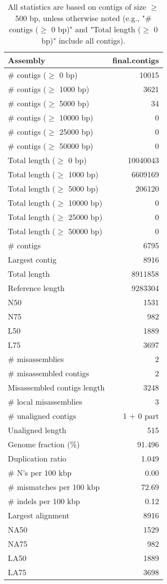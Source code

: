 \documentclass[12pt,a4paper]{article}
\begin{document}
\begin{table}[ht]
\begin{center}
\caption{All statistics are based on contigs of size $\geq$ 500 bp, unless otherwise noted (e.g., "\# contigs ($\geq$ 0 bp)" and "Total length ($\geq$ 0 bp)" include all contigs).}
\begin{tabular}{|l*{1}{|r}|}
\hline
Assembly & final.contigs \\ \hline
\# contigs ($\geq$ 0 bp) & 10015 \\ \hline
\# contigs ($\geq$ 1000 bp) & 3621 \\ \hline
\# contigs ($\geq$ 5000 bp) & 34 \\ \hline
\# contigs ($\geq$ 10000 bp) & 0 \\ \hline
\# contigs ($\geq$ 25000 bp) & 0 \\ \hline
\# contigs ($\geq$ 50000 bp) & 0 \\ \hline
Total length ($\geq$ 0 bp) & 10040043 \\ \hline
Total length ($\geq$ 1000 bp) & 6609169 \\ \hline
Total length ($\geq$ 5000 bp) & 206120 \\ \hline
Total length ($\geq$ 10000 bp) & 0 \\ \hline
Total length ($\geq$ 25000 bp) & 0 \\ \hline
Total length ($\geq$ 50000 bp) & 0 \\ \hline
\# contigs & 6795 \\ \hline
Largest contig & 8916 \\ \hline
Total length & 8911858 \\ \hline
Reference length & 9283304 \\ \hline
N50 & 1531 \\ \hline
N75 & 982 \\ \hline
L50 & 1889 \\ \hline
L75 & 3697 \\ \hline
\# misassemblies & 2 \\ \hline
\# misassembled contigs & 2 \\ \hline
Misassembled contigs length & 3248 \\ \hline
\# local misassemblies & 3 \\ \hline
\# unaligned contigs & 1 + 0 part \\ \hline
Unaligned length & 515 \\ \hline
Genome fraction (\%) & 91.496 \\ \hline
Duplication ratio & 1.049 \\ \hline
\# N's per 100 kbp & 0.00 \\ \hline
\# mismatches per 100 kbp & 72.69 \\ \hline
\# indels per 100 kbp & 0.12 \\ \hline
Largest alignment & 8916 \\ \hline
NA50 & 1529 \\ \hline
NA75 & 982 \\ \hline
LA50 & 1889 \\ \hline
LA75 & 3698 \\ \hline
\end{tabular}
\end{center}
\end{table}
\end{document}
